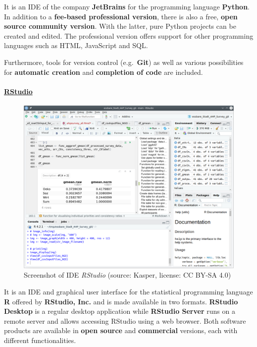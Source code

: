 \documentclass [oneside,10pt,a4paper,ngerman,BCOR10mm,headsepline,parindent,final]{scrartcl}
\begin{document}
It is an IDE of the company \textbf{JetBrains} for the programming
language \textbf{Python}. In addition to a \textbf{fee-based
professional version}, there is also a free, \textbf{open source
community version}. With the latter, pure Python projects can be created
and edited. The professional version offers support for other
programming languages such as HTML, JavaScript and SQL.

Furthermore, tools for version control (e.g.~\textbf{Git}) as well as
various possibilities for \textbf{automatic creation} and
\textbf{completion of code} are included.

    \hypertarget{rstudio}{%
\paragraph{\texorpdfstring{\href{https://en.wikipedia.org/wiki/RStudio}{RStudio}}{RStudio}}\label{rstudio}}

\begin{figure}
\centering
\includegraphics{images/Screenshot_RStudio.png}
\caption{Screenshot of IDE \emph{RStudio} (source: Kasper, license: CC
BY-SA 4.0)}
\end{figure}

It is an IDE and graphical user interface for the statistical
programming language \textbf{R} offered by \textbf{RStudio, Inc.} and is
made available in two formats. \textbf{RStudio Desktop} is a regular
desktop application while \textbf{RStudio Server} runs on a remote
server and allows accessing RStudio using a web browser. Both software
products are available in \textbf{open source} and \textbf{commercial}
versions, each with different functionalities.
\end{document}
